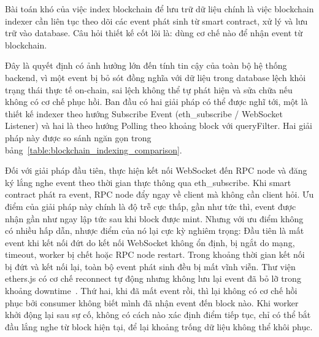 \documentclass[../DoAn.tex]{subfiles}
\begin{document}
Bài toán khó của việc index blockchain để lưu trữ dữ liệu chính là việc blockchain indexer cần liên tục theo dõi các event phát sinh từ smart contract, xử lý và lưu trữ vào database. Câu hỏi thiết kế cốt lõi là: dùng cơ chế nào để nhận event từ blockchain.

Đây là quyết định có ảnh hưởng lớn đến tính tin cậy của toàn bộ hệ thống backend, vì một event bị bỏ sót đồng nghĩa với dữ liệu trong database lệch khỏi trạng thái thực tế on-chain, sai lệch không thể tự phát hiện và sửa chữa nếu không có cơ chế phục hồi. Ban đầu có hai giải pháp có thể được nghĩ tới, một là thiết kế indexer theo hướng Subscribe Event (eth\_subscribe / WebSocket Listener) và hai là theo hướng Polling theo khoảng block với queryFilter. Hai giải pháp này được so sánh ngăn gọn trong bảng~\ref{table:blockchain_indexing_comparison}.

Đối với giải pháp đầu tiên, thực hiện kết nối WebSocket đến RPC node và đăng ký lắng nghe event theo thời gian thực thông qua eth\_subscribe. Khi smart contract phát ra event, RPC node đẩy ngay về client mà không cần client hỏi. Ưu điểm của giải pháp này chính là độ trễ cực thấp, gần như tức thì, event được nhận gần như ngay lập tức sau khi block được mint. Nhưng với ưu điểm không có nhiều hấp dẫn, nhược điểm của nó lại cực kỳ nghiêm trọng: Đầu tiên là mất event khi kết nối đứt do kết nối WebSocket không ổn định, bị ngắt do mạng, timeout, worker bị chết hoặc RPC node restart. Trong khoảng thời gian kết nối bị đứt và kết nối lại, toàn bộ event phát sinh đều bị mất vĩnh viễn. Thư viện ethers.js có cơ chế reconnect tự động nhưng không lưu lại event đã bỏ lỡ trong khoảng downtime~\cite{EthersJsDocs}. Thứ hai, khi đã mất event rồi, thì lại không có cơ chế hồi phục bởi consumer không biết mình đã nhận event đến block nào. Khi worker khởi động lại sau sự cố, không có cách nào xác định điểm tiếp tục, chỉ có thể bắt đầu lắng nghe từ block hiện tại, để lại khoảng trống dữ liệu không thể khôi phục.
\end{document}
